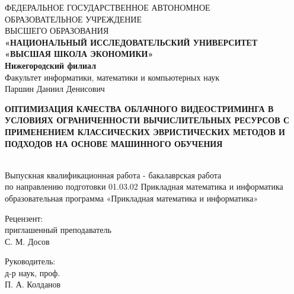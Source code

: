 \documentclass[12pt,a4paper,oneside,openany]{report}
\begin{document}

\begin{titlepage}
  \thispagestyle{empty}

  \begin{center}
    \small
    ФЕДЕРАЛЬНОЕ ГОСУДАРСТВЕННОЕ АВТОНОМНОЕ\\
    ОБРАЗОВАТЕЛЬНОЕ УЧРЕЖДЕНИЕ\\
    ВЫСШЕГО ОБРАЗОВАНИЯ\\
    \textbf{«НАЦИОНАЛЬНЫЙ ИССЛЕДОВАТЕЛЬСКИЙ УНИВЕРСИТЕТ\\
    «ВЫСШАЯ ШКОЛА ЭКОНОМИКИ»}\\
    \textbf{Нижегородский филиал}\\[0.35cm]
    Факультет информатики, математики и компьютерных наук\\[1.10cm]

    \normalsize
    Паршин Даниил Денисович\\[1.20cm]

    \begin{minipage}{0.92\linewidth}
      \centering
      \textbf{ОПТИМИЗАЦИЯ КАЧЕСТВА ОБЛАЧНОГО ВИДЕОСТРИМИНГА В УСЛОВИЯХ ОГРАНИЧЕННОСТИ
      ВЫЧИСЛИТЕЛЬНЫХ РЕСУРСОВ С ПРИМЕНЕНИЕМ КЛАССИЧЕСКИХ ЭВРИСТИЧЕСКИХ МЕТОДОВ И
      ПОДХОДОВ НА ОСНОВЕ МАШИННОГО ОБУЧЕНИЯ}
    \end{minipage}\\[0.60cm]

    Выпускная квалификационная работа - бакалаврская работа\\
    по направлению подготовки 01.03.02 Прикладная математика и информатика\\
    образовательная программа «Прикладная математика и информатика»
  \end{center}

  \vspace{1.10cm}

  \noindent\hspace*{0.16\linewidth}%
  \begin{minipage}[t]{0.80\linewidth}
    \begin{minipage}[t]{0.45\linewidth}
      \raggedright
      Рецензент:\\
      приглашенный преподаватель\\
      С. М. Досов
    \end{minipage}
    \hfill
    \begin{minipage}[t]{0.45\linewidth}
      \raggedright
      Руководитель:\\
      д-р наук, проф.\\
      П. А. Колданов\\[0.70cm]


\end{minipage}
\end{minipage}
\end{titlepage}
\end{document}
